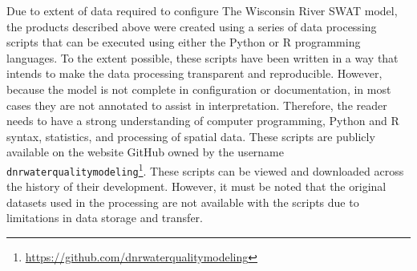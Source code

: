 Due to extent of data required to configure The Wisconsin River SWAT model, the
products described above were created using a series of data processing scripts
that can be executed using either the Python or R programming languages. To the
extent possible, these scripts have been written in a way that intends to make
the data processing transparent and reproducible. However, because the model is
not complete in configuration or documentation, in most cases they are not
annotated to assist in interpretation. Therefore, the reader needs to have a
strong understanding of computer programming, Python and R syntax, statistics,
and processing of spatial data. These scripts are publicly available on the
website GitHub owned by the username
\texttt{dnrwaterqualitymodeling}\footnote{\url{https://github.com/dnrwaterqualitymodeling}}. These scripts can be viewed and downloaded
across the history of their development. However, it must be noted that the
original datasets used in the processing are not available with the scripts due
to limitations in data storage and transfer.

\pagebreak
